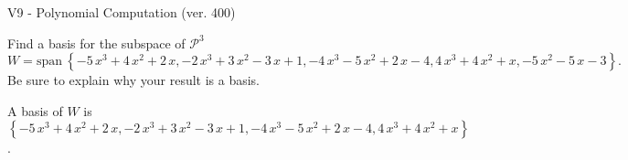 \begin{exercise}
  \begin{exerciseTitle}V9 - Polynomial Computation (ver. 400)\end{exerciseTitle}
  \begin{exerciseStatement}
    Find a basis for the subspace of \(\mathcal{P}^3\) 
\[W=\mathrm{span}\ \left\{-5 \, x^{3} + 4 \, x^{2} + 2 \, x , -2 \, x^{3} + 3 \, x^{2} - 3 \, x + 1 , -4 \, x^{3} - 5 \, x^{2} + 2 \, x - 4 , 4 \, x^{3} + 4 \, x^{2} + x , -5 \, x^{2} - 5 \, x - 3\right\}.\]
 Be sure to explain why your result is a basis.


  \end{exerciseStatement}
  \begin{exerciseAnswer}
   A basis of \(W\) is  \(\left\{-5 \, x^{3} + 4 \, x^{2} + 2 \, x , -2 \, x^{3} + 3 \, x^{2} - 3 \, x + 1 , -4 \, x^{3} - 5 \, x^{2} + 2 \, x - 4 , 4 \, x^{3} + 4 \, x^{2} + x\right\}\).
  


  \end{exerciseAnswer}
\end{exercise}